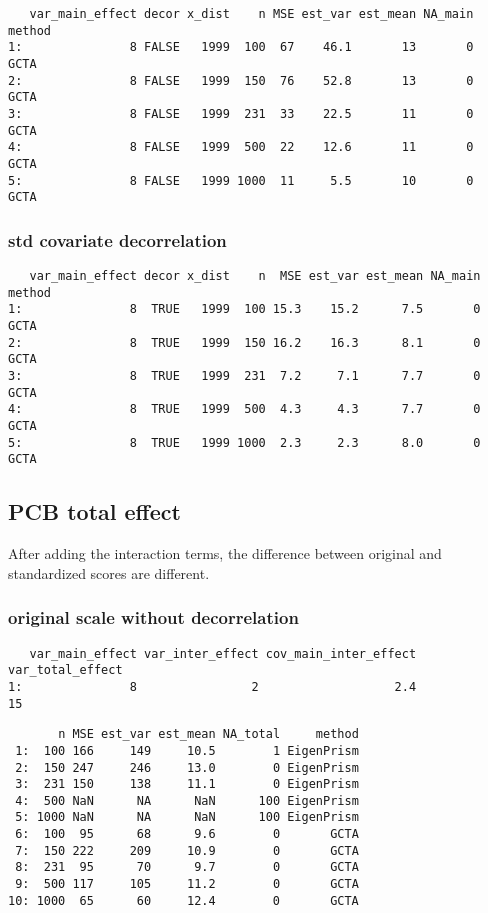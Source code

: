 \documentclass[]{article}
\begin{document}
\begin{verbatim}
   var_main_effect decor x_dist    n MSE est_var est_mean NA_main method
1:               8 FALSE   1999  100  67    46.1       13       0   GCTA
2:               8 FALSE   1999  150  76    52.8       13       0   GCTA
3:               8 FALSE   1999  231  33    22.5       11       0   GCTA
4:               8 FALSE   1999  500  22    12.6       11       0   GCTA
5:               8 FALSE   1999 1000  11     5.5       10       0   GCTA
\end{verbatim}

\subsubsection{std covariate
decorrelation}\label{std-covariate-decorrelation}

\begin{verbatim}
   var_main_effect decor x_dist    n  MSE est_var est_mean NA_main method
1:               8  TRUE   1999  100 15.3    15.2      7.5       0   GCTA
2:               8  TRUE   1999  150 16.2    16.3      8.1       0   GCTA
3:               8  TRUE   1999  231  7.2     7.1      7.7       0   GCTA
4:               8  TRUE   1999  500  4.3     4.3      7.7       0   GCTA
5:               8  TRUE   1999 1000  2.3     2.3      8.0       0   GCTA
\end{verbatim}

\newpage

\subsection{PCB total effect}\label{pcb-total-effect}

After adding the interaction terms, the difference between original and
standardized scores are different.

\subsubsection{original scale without
decorrelation}\label{original-scale-without-decorrelation-1}

\begin{verbatim}
   var_main_effect var_inter_effect cov_main_inter_effect var_total_effect
1:               8                2                   2.4               15
\end{verbatim}

\begin{verbatim}
       n MSE est_var est_mean NA_total     method
 1:  100 166     149     10.5        1 EigenPrism
 2:  150 247     246     13.0        0 EigenPrism
 3:  231 150     138     11.1        0 EigenPrism
 4:  500 NaN      NA      NaN      100 EigenPrism
 5: 1000 NaN      NA      NaN      100 EigenPrism
 6:  100  95      68      9.6        0       GCTA
 7:  150 222     209     10.9        0       GCTA
 8:  231  95      70      9.7        0       GCTA
 9:  500 117     105     11.2        0       GCTA
10: 1000  65      60     12.4        0       GCTA
\end{verbatim}
\end{document}

